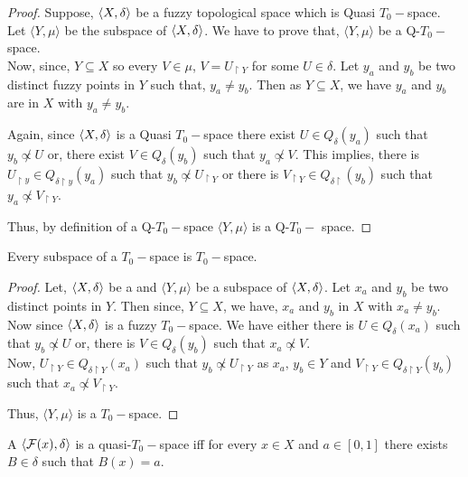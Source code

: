 \documentclass[../main-sheet.tex]{subfiles}
\begin{document}
\begin{proof}
    Suppose, \(\langle X, \delta \rangle\) be a fuzzy topological space which is Quasi \(T_0-\)space. Let \(\langle Y, \mu\rangle\) be the subspace of \(\langle X, \delta \rangle\). We have to prove that, \(\langle Y,\mu\rangle\) be a Q-\(T_0-\)space.\\

    Now, since, \(Y\subseteq X\) so every \(V\in \mu \), \(V=U_{\upharpoonright Y}\) for some \(U\in \delta\). Let \(y_a\) and \(y_b\) be two distinct fuzzy points in \(Y\) such that, \(y_a\neq y_b\). Then as \(Y\subseteq X\), we have \(y_a\) and \(y_b\) are in \(X\) with \(y_a\neq y_b\).

    Again, since \(\langle X, \delta \rangle\) is a Quasi \(T_0-\)space there exist \(U\in Q_\delta(y_a)\) such that \(y_b\not\propto U\) or, there exist \(V\in Q_\delta(y_b)\) such that \(y_a\not\propto V\). This implies, there is \(U_{\upharpoonright y}\in Q_{\delta\upharpoonright y}(y_a)\) such that \(y_b\not\propto U_{\upharpoonright Y}\) or there is \(V_{\upharpoonright Y} \in Q_{\delta\upharpoonright}(y_b)\) such that \(y_a\not\propto V_{\upharpoonright Y}\).

    Thus, by definition of a Q-\(T_0-\)space \(\langle Y, \mu\rangle\) is a Q-\(T_0-\) space.
\end{proof}
\begin{thm}
    Every subspace of a \(T_0-\)space is \(T_0-\)space.
\end{thm}
\begin{proof}
    Let, \(\langle X, \delta \rangle\) be a \fts and \(\langle Y,\mu\rangle\) be a subspace of \(\langle X, \delta \rangle\). Let \(x_a\) and \(y_b\) be two distinct points in \(Y\). Then since, \(Y\subseteq X\), we have, \(x_a\) and \(y_b\) in \(X\) with \(x_a\neq y_b\). Now since \(\langle X, \delta \rangle\) is a fuzzy \(T_0-\)space. We have either there is \(U\in Q_\delta(x_a)\) such that \(y_b\not\propto U\) or, there is \(V\in Q_\delta(y_b)\) such that \(x_a\not\propto V\).\\
    Now, \(U_{\upharpoonright Y}\in Q_{\delta\upharpoonright Y}(x_a)\) such that \(y_b\not\propto U_{\upharpoonright Y}\) as \(x_a,\,y_b\in Y\) and \(V_{\upharpoonright Y} \in Q_{\delta \upharpoonright Y}(y_b)\) such that \(x_a\not\propto V_{\upharpoonright Y}\).
    
    Thus, \(\langle Y,\mu\rangle\) is a \(T_0-\)space. 
\end{proof}
\begin{thm}
    A \fts \(\langle \mathcal{F}(x), \delta \rangle\) is a quasi-\(T_0-\)space iff for every \(x\in X\) and \(a\in [0,1]\) there exists \(B\in\delta\) such that \(B(x)=a\).
\end{thm}
\end{document}
